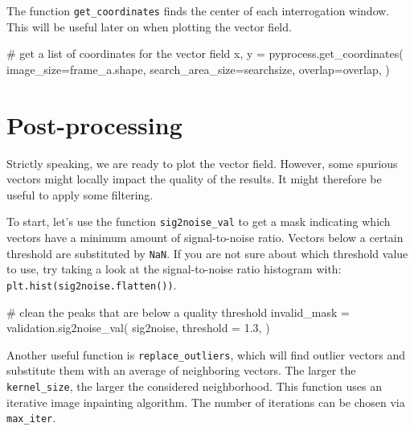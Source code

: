 \documentclass[
  english,
  letterpaper,
  numbers=noendperiod,
  DIV=13]{scrreprt}
\newenvironment{Shaded}{\begin{snugshade}}{\end{snugshade}}
\newcommand{\CommentTok}[1]{\textcolor[rgb]{0.37,0.37,0.37}{#1}}
\newcommand{\FloatTok}[1]{\textcolor[rgb]{0.68,0.00,0.00}{#1}}
\newcommand{\NormalTok}[1]{\textcolor[rgb]{0.00,0.23,0.31}{#1}}
\newcommand{\OperatorTok}[1]{\textcolor[rgb]{0.37,0.37,0.37}{#1}}
\begin{document}
The function \texttt{get\_coordinates} finds the center of each
interrogation window. This will be useful later on when plotting the
vector field.

\begin{Shaded}
\begin{Highlighting}[]
\CommentTok{\# get a list of coordinates for the vector field}
\NormalTok{x, y }\OperatorTok{=}\NormalTok{ pyprocess.get\_coordinates(}
\NormalTok{    image\_size}\OperatorTok{=}\NormalTok{frame\_a.shape,}
\NormalTok{    search\_area\_size}\OperatorTok{=}\NormalTok{searchsize,}
\NormalTok{    overlap}\OperatorTok{=}\NormalTok{overlap,}
\NormalTok{)}
\end{Highlighting}
\end{Shaded}

\section{Post-processing}\label{post-processing}

Strictly speaking, we are ready to plot the vector field. However, some
spurious vectors might locally impact the quality of the results. It
might therefore be useful to apply some filtering.

To start, let's use the function \texttt{sig2noise\_val} to get a mask
indicating which vectors have a minimum amount of signal-to-noise ratio.
Vectors below a certain threshold are substituted by \texttt{NaN}. If
you are not sure about which threshold value to use, try taking a look
at the signal-to-noise ratio histogram with:
\texttt{plt.hist(sig2noise.flatten())}.

\begin{Shaded}
\begin{Highlighting}[]
\CommentTok{\# clean the peaks that are below a quality threshold}
\NormalTok{invalid\_mask }\OperatorTok{=}\NormalTok{ validation.sig2noise\_val(}
\NormalTok{    sig2noise,}
\NormalTok{    threshold }\OperatorTok{=} \FloatTok{1.3}\NormalTok{,}
\NormalTok{)}
\end{Highlighting}
\end{Shaded}

Another useful function is \texttt{replace\_outliers}, which will find
outlier vectors and substitute them with an average of neighboring
vectors. The larger the \texttt{kernel\_size}, the larger the considered
neighborhood. This function uses an iterative image inpainting
algorithm. The number of iterations can be chosen via
\texttt{max\_iter}.
\end{document}
